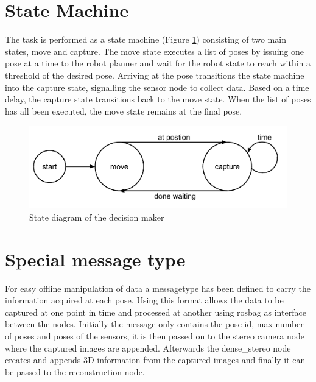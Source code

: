
\section{State Machine}
The task is performed as a state machine (Figure \ref{fig:state_diagram}) consisting of two main states, move and capture. The move state executes a list of poses by issuing one pose at a time to the robot planner and wait for the robot state to reach within a threshold of the desired pose. Arriving at the pose transitions the state machine into the capture state, signalling the sensor node to collect data. Based on a time delay, the capture state transitions back to the move state. When the list of poses has all been executed, the move state remains at the final pose.


\begin{figure}[htb]
	\begin{center}
		\includegraphics[scale=0.5,trim=0 0 0 0]{graphics/04_decisionmaking/state_diagram.pdf}%
		\caption{State diagram of the decision maker}
		\label{fig:state_diagram}
	\end{center}
\end{figure}

\section{Special message type}
For easy offline manipulation of data a messagetype has been defined to carry the information acquired at each pose. Using this format allows the data to be captured at one point in time and processed at another using rosbag as interface between the nodes. Initially the message only contains the pose id, max number of poses and poses of the sensors, it is then passed on to the stereo camera node where the captured images are appended. Afterwards the dense\_stereo node creates and appends 3D information from the captured images and finally it can be passed to the reconstruction node.

